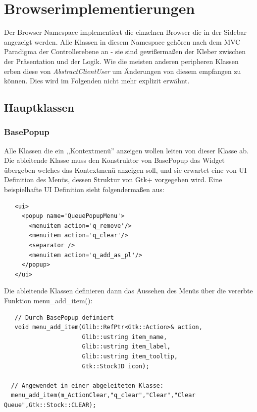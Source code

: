 \section{Browserimplementierungen}

Der Browser Namespace implementiert die einzelnen Browser die in der Sidebar angezeigt werden.
Alle Klassen in diesem Namespace gehören nach dem MVC Paradigma der Controllerebene an - sie sind gewißermaßen der Kleber zwischen der Präsentation und der Logik.
Wie die meisten anderen peripheren Klassen erben diese von \emph{AbstractClientUser} um Änderungen von diesem empfangen zu können. Dies wird im Folgenden nicht mehr explizit erwähnt.

\subsection{Hauptklassen}
\subsubsection{BasePopup}

Alle Klassen die ein ,,Kontextmenü'' anzeigen wollen leiten von dieser Klasse ab.
Die ableitende Klasse muss den Konstruktor von BasePopup das Widget übergeben welches das Kontextmenü anzeigen soll, 
und sie erwartet eine von UI Definition des Menüs, dessen Struktur von Gtk+ vorgegeben wird.
Eine beispielhafte UI Definition sieht folgendermaßen aus:
\begin{verbatim}
   <ui>
     <popup name='QueuePopupMenu'>
       <menuitem action='q_remove'/>
       <menuitem action='q_clear'/>
       <separator />
       <menuitem action='q_add_as_pl'/>
     </popup>
   </ui>
\end{verbatim}

Die ableitende Klassen definieren dann das Aussehen des Menüs über die vererbte Funktion menu\_add\_item():
\begin{verbatim}
   // Durch BasePopup definiert
   void menu_add_item(Glib::RefPtr<Gtk::Action>& action,
                      Glib::ustring item_name,
                      Glib::ustring item_label,
                      Glib::ustring item_tooltip,
                      Gtk::StockID icon);
                      
  // Angewendet in einer abgeleiteten Klasse:
  menu_add_item(m_ActionClear,"q_clear","Clear","Clear Queue",Gtk::Stock::CLEAR);
\end{verbatim} 

